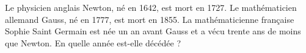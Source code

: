 \begin{exercice}
    Le physicien anglais Newton, né en 1642, est mort en 1727. Le mathématicien allemand Gauss, né en 1777, est mort en 1855. La mathématicienne française Sophie Saint Germain est née un an avant Gauss et a vécu trente ans de moins que Newton. En quelle année est-elle décédée ?
 \end{exercice}
